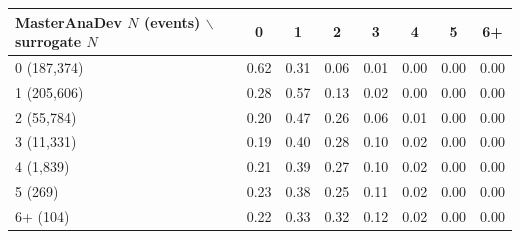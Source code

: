 \begin{tabular}{lccccccc}
\toprule
MasterAnaDev $N$ (events) $\backslash$ surrogate $N$ & 0 & 1 & 2 & 3 & 4 & 5 & 6+ \\
\midrule
0 (187,374) & 0.62 & 0.31 & 0.06 & 0.01 & 0.00 & 0.00 & 0.00 \\
1 (205,606) & 0.28 & 0.57 & 0.13 & 0.02 & 0.00 & 0.00 & 0.00 \\
2 (55,784) & 0.20 & 0.47 & 0.26 & 0.06 & 0.01 & 0.00 & 0.00 \\
3 (11,331) & 0.19 & 0.40 & 0.28 & 0.10 & 0.02 & 0.00 & 0.00 \\
4 (1,839) & 0.21 & 0.39 & 0.27 & 0.10 & 0.02 & 0.00 & 0.00 \\
5 (269) & 0.23 & 0.38 & 0.25 & 0.11 & 0.02 & 0.00 & 0.00 \\
6+ (104) & 0.22 & 0.33 & 0.32 & 0.12 & 0.02 & 0.00 & 0.00 \\
\bottomrule
\end{tabular}
